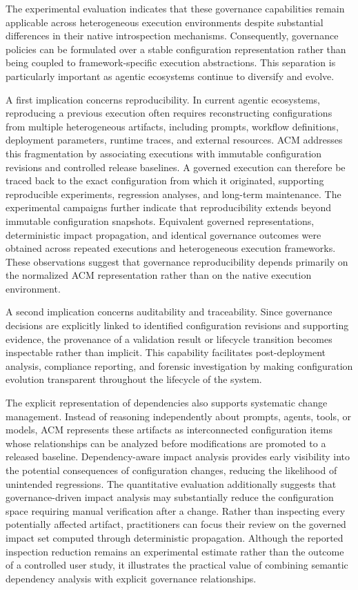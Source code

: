 \documentclass[10pt]{article}
\begin{document}
The experimental evaluation indicates that these governance capabilities remain applicable across heterogeneous execution environments despite substantial differences in their native introspection mechanisms. Consequently, governance policies can be formulated over a stable configuration representation rather than being coupled to framework-specific execution abstractions. This separation is particularly important as agentic ecosystems continue to diversify and evolve.

A first implication concerns reproducibility. In current agentic ecosystems, reproducing a previous execution often requires reconstructing configurations from multiple heterogeneous artifacts, including prompts, workflow definitions, deployment parameters, runtime traces, and external resources. ACM addresses this fragmentation by associating executions with immutable configuration revisions and controlled release baselines. A governed execution can therefore be traced back to the exact configuration from which it originated, supporting reproducible experiments, regression analyses, and long-term maintenance. The experimental campaigns further indicate that reproducibility extends beyond immutable configuration snapshots. Equivalent governed representations, deterministic impact propagation, and identical governance outcomes were obtained across repeated executions and heterogeneous execution frameworks. These observations suggest that governance reproducibility depends primarily on the normalized ACM representation rather than on the native execution environment.

A second implication concerns auditability and traceability. Since governance decisions are explicitly linked to identified configuration revisions and supporting evidence, the provenance of a validation result or lifecycle transition becomes inspectable rather than implicit. This capability facilitates post-deployment analysis, compliance reporting, and forensic investigation by making configuration evolution transparent throughout the lifecycle of the system.

The explicit representation of dependencies also supports systematic change management. Instead of reasoning independently about prompts, agents, tools, or models, ACM represents these artifacts as interconnected configuration items whose relationships can be analyzed before modifications are promoted to a released baseline. Dependency-aware impact analysis provides early visibility into the potential consequences of configuration changes, reducing the likelihood of unintended regressions. The quantitative evaluation additionally suggests that governance-driven impact analysis may substantially reduce the configuration space requiring manual verification after a change. Rather than inspecting every potentially affected artifact, practitioners can focus their review on the governed impact set computed through deterministic propagation. Although the reported inspection reduction remains an experimental estimate rather than the outcome of a controlled user study, it illustrates the practical value of combining semantic dependency analysis with explicit governance relationships.
\end{document}
